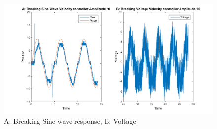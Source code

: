 \documentclass[12pt,a4paper]{article}
\begin{document}
\begin{center}
      \begin{figure}[H]
        \centering
        \includegraphics[scale=0.5]{41SiVoBr.png}
        \caption{A: Breaking Sine wave response, B: Voltage }
        \label{fig:41SiVoBr}
      \end{figure}
  \end{center}
 
\end{document}
